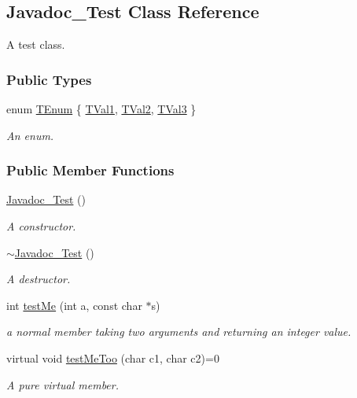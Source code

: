 \hypertarget{class_javadoc___test}{}\subsection{Javadoc\+\_\+\+Test Class Reference}
\label{class_javadoc___test}


A test class.  


\subsubsection*{Public Types}
\begin{DoxyCompactItemize}
\item 
enum \hyperlink{class_javadoc___test_ae37fd1cbf1af522674cbd33873b786a6}{T\+Enum} \{ \hyperlink{class_javadoc___test_ae37fd1cbf1af522674cbd33873b786a6a90f0d8d4f07a79342261fb1c191af72b}{T\+Val1}, 
\hyperlink{class_javadoc___test_ae37fd1cbf1af522674cbd33873b786a6a5954e696a652f442d7255af4e0d35d61}{T\+Val2}, 
\hyperlink{class_javadoc___test_ae37fd1cbf1af522674cbd33873b786a6ab4a4dc16e1050c9604cf5c46a51e5a8e}{T\+Val3}
 \}\begin{DoxyCompactList}\small\item\em An enum. \end{DoxyCompactList}
\end{DoxyCompactItemize}
\subsubsection*{Public Member Functions}
\begin{DoxyCompactItemize}
\item 
\hyperlink{class_javadoc___test_a17313327932ae97596b0a455ba8342cc}{Javadoc\+\_\+\+Test} ()
\begin{DoxyCompactList}\small\item\em A constructor. \end{DoxyCompactList}\item 
\hyperlink{class_javadoc___test_a60016cd15a4ed82bbc35be79a0a6a6b5}{$\sim$\+Javadoc\+\_\+\+Test} ()
\begin{DoxyCompactList}\small\item\em A destructor. \end{DoxyCompactList}\item 
int \hyperlink{class_javadoc___test_a0c472683ed25ff096e8a9edfb18d550c}{test\+Me} (int a, const char $\ast$s)
\begin{DoxyCompactList}\small\item\em a normal member taking two arguments and returning an integer value. \end{DoxyCompactList}\item 
virtual void \hyperlink{class_javadoc___test_ac2b39cabbe80957ae3e8bc2bd4e887f6}{test\+Me\+Too} (char c1, char c2)=0
\begin{DoxyCompactList}\small\item\em A pure virtual member. \end{DoxyCompactList}\end{DoxyCompactItemize}
